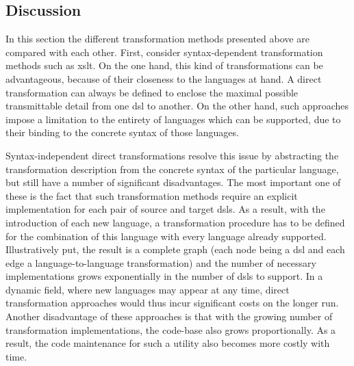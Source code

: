 \subsection{Discussion}

In this section the different transformation methods presented above are compared with each other. First, consider syntax-dependent transformation methods such as \gls{xslt}. On the one hand, this kind of transformations can be advantageous, because of their closeness to the languages at hand. A direct transformation can always be defined to enclose the maximal possible transmittable detail from one \gls{dsl} to another. On the other hand, such approaches impose a limitation to the entirety of languages which can be supported, due to their binding to the concrete syntax of those languages.

Syntax-independent direct transformations resolve this issue by abstracting the transformation description from the concrete syntax of the particular language, but still have a number of significant disadvantages. The most important one of these is the fact that such transformation methods require an explicit implementation for each pair of source and target \glspl{dsl}. As a result, with the introduction of each new language, a transformation procedure has to be defined for the combination of this language with every language already supported. Illustratively put, the result is a complete graph (each node being a \gls{dsl} and each edge a language-to-language transformation) and the number of necessary implementations grows exponentially in the number of \glspl{dsl} to support. In a dynamic field, where new languages may appear at any time, direct transformation approaches would thus incur significant costs on the longer run. Another disadvantage of these approaches is that with the growing number of transformation implementations, the code-base also grows proportionally. As a result, the code maintenance for such a utility also becomes more costly with time. 

